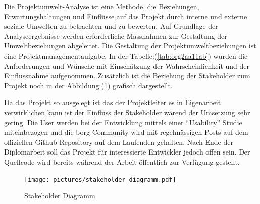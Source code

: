 Die Projektumwelt-Analyse ist eine Methode, die Beziehungen,
Erwartungshaltungen und Einflüsse auf das Projekt durch interne und
externe soziale Umwelten zu betrachten und zu bewerten. Auf Grundlage
der Analyseergebnisse werden erforderliche Massnahmen zur Gestaltung
der Umweltbeziehungen abgeleitet. Die Gestaltung der
Projektumweltbeziehungen ist eine Projektmanagementaufgabe. In der
Tabelle:(\ref{tab:org2aa11ab}) wurden die Anforderungen und Wünsche
mit Einschätzung der Wahrscheinlichkeit und der Einflussnahme aufgenommen.
Zusätzlich ist die Beziehung der Stakeholder zum Projekt noch in der
Abbildung:(\ref{fig:orgbb87a04}) grafisch dargestellt.

Da das Projekt so ausgelegt ist das der Projektleiter es in Eigenarbeit
verwirklichen kann ist der Einfluss der Stakeholder wärend der Umsetzung sehr
gering. Die User werden bei der Entwicklung mittels einer "`Usability"' Studie
miteinbezogen und die \gls{borg} Community wird mit regelmässigen Posts auf dem
offiziellen Github Repository auf dem Laufenden gehalten.
Nach Ende der Diplomarbeit soll das Projekt für interessierte Entwickler jedoch
offen sein. Der Quellcode wird bereits während der Arbeit öffentlich zur
Verfügung gestellt.

\begin{figure}[htbp]
\centering
\texttt{[image: pictures/stakeholder\_diagramm.pdf]}
\caption{\label{fig:orgbb87a04}
Stakeholder Diagramm}
\end{figure}

